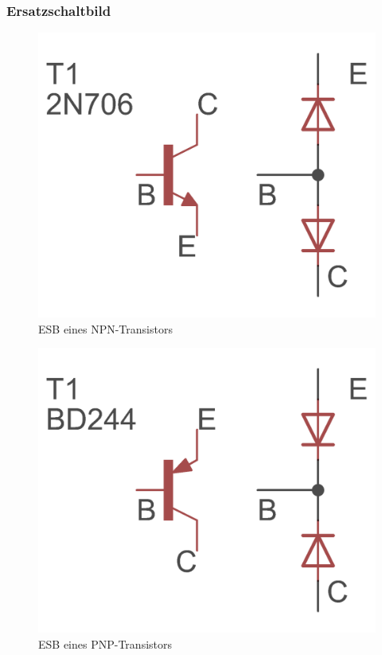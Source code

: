 \begin{frame}
\frametitle{Ersatzschaltbild}

\begin{minipage}{0.4\textwidth}
	\begin{figure}
      \includegraphics[width=\textwidth,height=.4\textheight,keepaspectratio]{e13/NPN_esb.png}
      \caption{ESB eines \hbox{NPN-Transistors}}
    \end{figure}
\end{minipage}
\hspace{0.5cm}
\begin{minipage}{0.4\textwidth}
	 \begin{figure}
      \includegraphics[width=\textwidth,height=.4\textheight,keepaspectratio]{e13/PNP_esb.png}
      \caption{ESB eines \hbox{PNP-Transistors}}
    \end{figure}
\end{minipage}


\end{frame}
